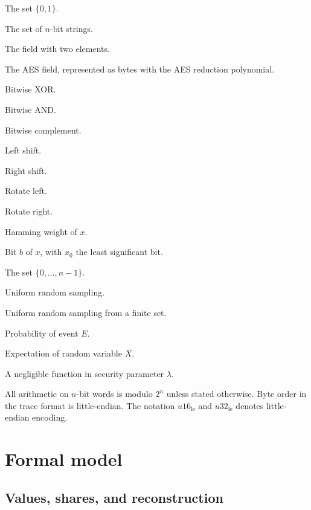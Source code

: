 \documentclass[11pt,a4paper]{article}
\newcommand{\F}{\mathbb{F}}
\newcommand{\bits}{\{0,1\}}
\newcommand{\HW}{\mathsf{HW}}
\newcommand{\E}{\mathbb{E}}
\newcommand{\Prb}{\Pr}
\newcommand{\negl}{\mathsf{negl}}
\theoremstyle{plain}
\theoremstyle{definition}
\theoremstyle{remark}
\begin{document}
\begin{description}[leftmargin=1.5em]
  \item[\(\bits\)] The set \(\{0,1\}\).
  \item[\(\bits^n\)] The set of \(n\)-bit strings.
  \item[\(\F_2\)] The field with two elements.
  \item[\(\F_{2^8}\)] The AES field, represented as bytes with the AES reduction
        polynomial.
  \item[\(\oplus\)] Bitwise XOR.
  \item[\(\wedge\)] Bitwise AND.
  \item[\(\neg\)] Bitwise complement.
  \item[\(\ll\)] Left shift.
  \item[\(\gg\)] Right shift.
  \item[\(\lll\)] Rotate left.
  \item[\(\ggg\)] Rotate right.
  \item[\(\HW(x)\)] Hamming weight of \(x\).
  \item[\(x_b\)] Bit \(b\) of \(x\), with \(x_0\) the least significant bit.
  \item[{\([n]\)}] The set \(\{0,\ldots,n-1\}\).
  \item[\(\gets\)] Uniform random sampling.
  \item[\(\gets_{\$}\)] Uniform random sampling from a finite set.
  \item[{\(\Prb[E]\)}] Probability of event \(E\).
  \item[{\(\E[X]\)}] Expectation of random variable \(X\).
  \item[\(\negl(\lambda)\)] A negligible function in security parameter \(\lambda\).
\end{description}

All arithmetic on \(n\)-bit words is modulo \(2^n\) unless stated otherwise. Byte order
in the trace format is little-endian. The notation \(u16_{\mathrm{le}}\) and
\(u32_{\mathrm{le}}\) denotes little-endian encoding.

\section{Formal model}\label{sec:model}

\subsection{Values, shares, and reconstruction}
\end{document}
